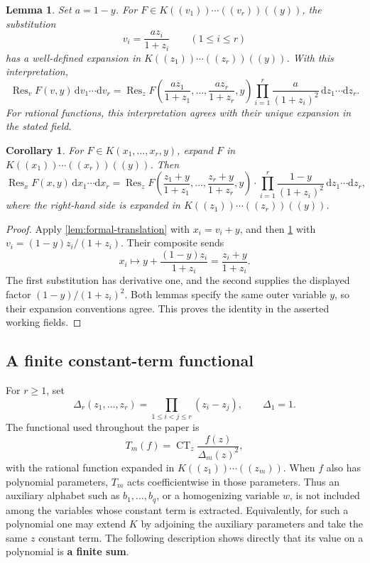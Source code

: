 \documentclass[reqno, 12pt]{article}
\numberwithin{equation}{section}
\newtheorem{lemma}[theorem]{Lemma}
\newtheorem{corollary}[theorem]{Corollary}
\theoremstyle{definition}
\DeclareMathOperator{\CT}{CT}
\DeclareMathOperator{\Res}{Res}
\newcommand{\dd}{\mathrm d}
\begin{document}
\begin{lemma}\label{lem:formal-origin-substitution}
Set $a=1-y$.  For $F\in K((v_1))\cdots((v_r))((y))$, the substitution
\[
v_i=\frac{az_i}{1+z_i}\qquad(1\leq i\leq r)
\]
has a well-defined expansion in
$K((z_1))\cdots((z_r))((y))$.  With this interpretation,
\begin{equation*}
\Res_vF(v,y)\,\dd v_1\cdots\dd v_r
=\Res_zF\left(\frac{az_1}{1+z_1},\ldots,\frac{az_r}{1+z_r},y\right)\prod_{i=1}^r\frac{a}{(1+z_i)^2}\,\dd z_1\cdots\dd z_r.
\end{equation*}
For rational functions, this interpretation agrees with their
unique expansion in the stated field.
\end{lemma}


\begin{corollary}\label{cor:formal-mobius}
For $F\in K(x_1,\ldots,x_r,y)$, expand $F$ in $K((x_1))\cdots((x_r))((y))$.  Then
\begin{equation*}
\Res_xF(x,y)\,\dd x_1\cdots\dd x_r=\Res_z F\left(\frac{z_1+y}{1+z_1},\ldots,\frac{z_r+y}{1+z_r},y\right)\cdot\prod_{i=1}^r\frac{1-y}{(1+z_i)^2}\,\dd z_1\cdots\dd z_r,
\end{equation*}
where the right-hand side is expanded in $K((z_1))\cdots((z_r))((y))$.
\end{corollary}
\begin{proof}
Apply \cref{lem:formal-translation} with $x_i=v_i+y$,
and then \cref{lem:formal-origin-substitution} with
$v_i=(1-y)z_i/(1+z_i)$.  Their composite sends
\[
x_i\longmapsto y+\frac{(1-y)z_i}{1+z_i}=\frac{z_i+y}{1+z_i}.
\]
The first substitution has derivative one, and the second
supplies the displayed factor $(1-y)/(1+z_i)^2$.  Both lemmas
specify the same outer variable $y$, so their expansion conventions
agree.  This proves the identity in the asserted working fields.
\end{proof}


\subsection{A finite constant-term functional}

For $r\geq1$, set
\[
\Delta_r(z_1,\ldots,z_r)=\prod_{1\leq i<j\leq r}(z_i-z_j),
\qquad \Delta_1=1.
\]
The functional used throughout the paper is
\begin{equation}\label{eq:T-definition}
T_m(f)=\CT_z\frac{f(z)}{\Delta_m(z)^2},
\end{equation}
with the rational function expanded in
$K((z_1))\cdots((z_m))$.  When $f$ also has polynomial
parameters, $T_m$ acts coefficientwise in those parameters.  Thus
an auxiliary alphabet such as $b_1,\ldots,b_q$, or a homogenizing
variable $w$, is not included among the variables whose constant
term is extracted.  Equivalently, for such a polynomial one may
extend $K$ by adjoining the auxiliary parameters and take the
same $z$ constant term.
The following description shows directly that its value on a
polynomial is \textbf{a finite sum}.
\end{document}
